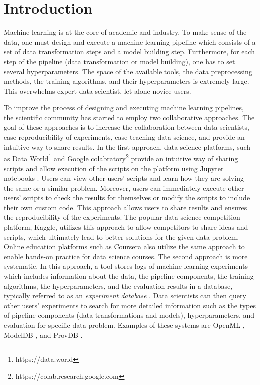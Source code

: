 \section{Introduction} \label{sec-introduction}
Machine learning is at the core of academic and industry.
To make sense of the data, one must design and execute a machine learning pipeline which consists of a set of data transformation steps and a model building step.
Furthermore, for each step of the pipeline (data transformation or model building), one has to set several hyperparameters.
The space of the available tools, the data preprocessing methods, the training algorithms, and their hyperparameters is extremely large.
This overwhelms expert data scientist, let alone novice users.

To improve the process of designing and executing machine learning pipelines, the scientific community has started to employ two collaborative approaches.
The goal of these approaches is to increase the collaboration between data scientists, ease reproducibility of experiments, ease teaching data science, and provide an intuitive way to share results.
In the first approach, data science platforms, such as Data World\footnote{https://data.world} and Google colabratory\footnote{https://colab.research.google.com} provide an intuitive way of sharing scripts and allow execution of the scripts on the platform using Jupyter notebooks \cite{Kluyver:2016aa}. 
Users can view other users' scripts and learn how they are solving the same or a similar problem.
Moreover, users can immediately execute other users' scripts to check the results for themselves or modify the scripts to include their own custom code.
This approach allows users to share results and ensures the reproducibility of the experiments.
The popular data science competition platform, Kaggle, utilizes this approach to allow competitors to share ideas and scripts, which ultimately lead to better solutions for the given data problem.
Online education platforms such as Coursera also utilize the same approach to enable hands-on practice for data science courses.
The second approach is more systematic.
In this approach, a tool stores logs of machine learning experiments which includes information about the data, the pipeline components, the training algorithms, the hyperparameters, and the evaluation results in a database, typically referred to as an \textit{experiment database} \cite{Vanschoren2012}.
Data scientists can then query other users' experiments to search for more detailed information such as the types of pipeline components (data transformations and models), hyperparameters, and evaluation for specific data problem.
Examples of these systems are OpenML \cite{vanschoren2014openml}, ModelDB \cite{vartak2016m}, and ProvDB \cite{miao2018provdb}.

